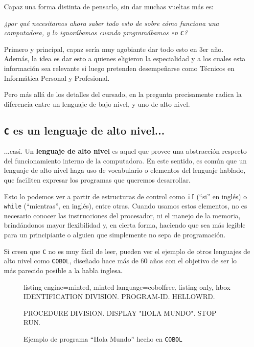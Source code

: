 \documentclass[a4paper, titlepage]{report}
\begin{document}
	Capaz una forma distinta de pensarlo, sin dar muchas vueltas más es:
	
	\begin{center}
		\textit{¿por qué necesitamos ahora saber todo esto de sobre cómo funciona una computadora, y lo ignorábamos cuando programábamos en \texttt{C}?}
	\end{center}
	
	Primero y principal, capaz sería muy agobiante dar todo esto en 3er año. Además, la idea es dar esto a quienes eligieron la especialidad y a los cuales esta información sea relevante si luego pretenden desempeñarse como Técnicos en Informática Personal y Profesional.
	
	Pero más allá de los detalles del cursado, en la pregunta precisamente radica la diferencia entre un lenguaje de bajo nivel, y uno de alto nivel.
	
	\subsection{\texttt{C} es un lenguaje de alto nivel...}
	
	...casi. Un \textbf{lenguaje de alto nivel} es aquel que provee una abstracción respecto del funcionamiento interno de la computadora. En este sentido, es común que un lenguaje de alto nivel haga uso de vocabulario o elementos del lenguaje hablado, que faciliten expresar los programas que queremos desarrollar.
	
	Esto lo podemos ver a partir de estructuras de control como \texttt{if} (``si'' en inglés) o \texttt{while} (``mientras'', en inglés), entre otras. Cuando usamos estos elementos, no es necesario conocer las instrucciones del procesador, ni el manejo de la memoria, brindándonos mayor flexibilidad y, en cierta forma, haciendo que sea más legible para un principiante o alguien que simplemente no sepa de programación.
	
	Si creen que \texttt{C} no es muy fácil de leer, pueden ver el ejemplo de otros lenguajes de alto nivel como \texttt{COBOL}, diseñado hace más de 60 años con el objetivo de ser lo más parecido posible a la habla inglesa. 
	
	\begin{figure}[h]
		\centering
\begin{tcblisting}{listing engine=minted, minted language=cobolfree, listing only, hbox}
IDENTIFICATION DIVISION.
PROGRAM-ID. HELLOWRD.

PROCEDURE DIVISION.
DISPLAY "HOLA MUNDO".
STOP RUN.
\end{tcblisting}
		\caption{Ejemplo de programa ``Hola Mundo'' hecho en \texttt{COBOL}}
	\end{figure}
\end{document}
